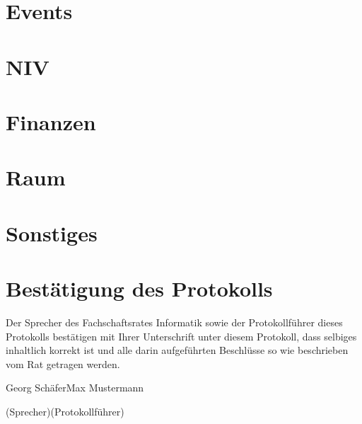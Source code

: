 \documentclass[a4paper, 11pt]{article} %
\newcommand{\abstimmung}[4]{
	\newcounter{summe}
	\setcounter{summe}{#3}
	\addtocounter{summe}{#4}
	\begin{flushleft}
		#1\\
	Es wird über den Antrag abgestimmt.
	\end{flushleft}
	\ifthenelse{\equal{#3}{0}\AND\equal{#4}{0}}{
	\begin{center}
		\textbf{Der Antrag wird einstimmig angenommen.}
	\end{center}
	}{
	\begin{center}
		#2 \ifthenelse{\equal{#2}{1}}{Stimme}{Stimmen} dafür, #3 \ifthenelse{\equal{#3}{1}}{Stimme}{Stimmen} dagegen, #4 \ifthenelse{\equal{#42}{1}}{Enthaltung}{Enthaltungen}\\
		\ifthenelse{#2>\value{summe}}{
		\textbf{Der Antrag ist somit angenommen.}
		}{
		\textbf{Der Antrag ist somit abgelehnt.}
		}
	\end{center}
	}  
}
\newcommand{\protokoller}{Max Mustermann}
\newcommand{\fsiPresident}{Georg Schäfer}
\begin{document}

\section{Events}

\section{NIV}

\section{Finanzen}

\section{Raum}

\section{Sonstiges}

\pagebreak
\section{Bestätigung des Protokolls}
Der Sprecher des Fachschaftsrates Informatik sowie der Protokollführer dieses Protokolls bestätigen mit Ihrer Unterschrift unter diesem Protokoll, dass selbiges inhaltlich korrekt ist und alle darin aufgeführten Beschlüsse so wie beschrieben vom Rat getragen werden.
\\

\vspace{3.5cm}
\hrulefill \hfill \hrulefill

\fsiPresident \hfill \protokoller

{\footnotesize (Sprecher)\hfill (Protokollführer)}
\end{document}
